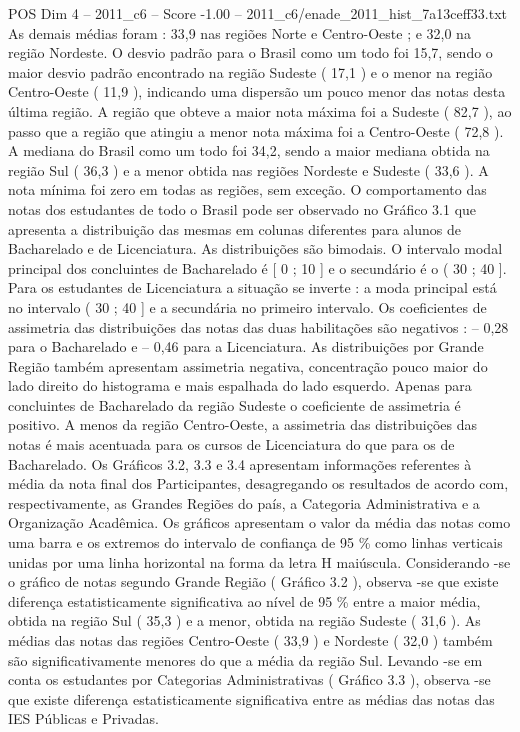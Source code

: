 \begin{textsample}{POS Dim 4 – 2011\_c6 – Score -1.00 – 2011\_c6/enade\_2011\_hist\_7a13ceff33.txt}
As demais médias foram : 33,9 nas regiões Norte e Centro-Oeste ; e 32,0 na região Nordeste.
O desvio padrão para o Brasil como um todo foi 15,7, sendo o maior desvio padrão encontrado na região Sudeste ( 17,1 ) e o menor na região Centro-Oeste ( 11,9 ), indicando uma dispersão um pouco menor das notas desta última região.
A região que obteve a maior nota máxima foi a Sudeste ( 82,7 ), ao passo que a região que atingiu a menor nota máxima foi a Centro-Oeste ( 72,8 ).
A mediana do Brasil como um todo foi 34,2, sendo a maior mediana obtida na região Sul ( 36,3 ) e a menor obtida nas regiões Nordeste e Sudeste ( 33,6 ).
A nota mínima foi zero em todas as regiões, sem exceção.
O comportamento das notas dos estudantes de todo o Brasil pode ser observado no Gráfico 3.1 que apresenta a distribuição das mesmas em colunas diferentes para alunos de Bacharelado e de Licenciatura.
As distribuições são bimodais.
O intervalo modal principal dos concluintes de Bacharelado é [ 0 ; 10 ] e o secundário é o ( 30 ; 40 ].
Para os estudantes de Licenciatura a situação se inverte : a moda principal está no intervalo ( 30 ; 40 ] e a secundária no primeiro intervalo.
Os coeficientes de assimetria das distribuições das notas das duas habilitações são negativos : – 0,28 para o Bacharelado e – 0,46 para a Licenciatura.
As distribuições por Grande Região também apresentam assimetria negativa, concentração pouco maior do lado direito do histograma e mais espalhada do lado esquerdo.
Apenas para concluintes de Bacharelado da região Sudeste o coeficiente de assimetria é positivo.
A menos da região Centro-Oeste, a assimetria das distribuições das notas é mais acentuada para os cursos de Licenciatura do que para os de Bacharelado.
Os Gráficos 3.2, 3.3 e 3.4 apresentam informações referentes à média da nota final dos Participantes, desagregando os resultados de acordo com, respectivamente, as Grandes Regiões do país, a Categoria Administrativa e a Organização Acadêmica.
Os gráficos apresentam o valor da média das notas como uma barra e os extremos do intervalo de confiança de 95 \% como linhas verticais unidas por uma linha horizontal na forma da letra H maiúscula.
Considerando -se o gráfico de notas segundo Grande Região ( Gráfico 3.2 ), observa -se que existe diferença estatisticamente significativa ao nível de 95 \% entre a maior média, obtida na região Sul ( 35,3 ) e a menor, obtida na região Sudeste ( 31,6 ).
As médias das notas das regiões Centro-Oeste ( 33,9 ) e Nordeste ( 32,0 ) também são significativamente menores do que a média da região Sul.
Levando -se em conta os estudantes por Categorias Administrativas ( Gráfico 3.3 ), observa -se que existe diferença estatisticamente significativa entre as médias das notas das IES Públicas e Privadas.

\end{textsample}
